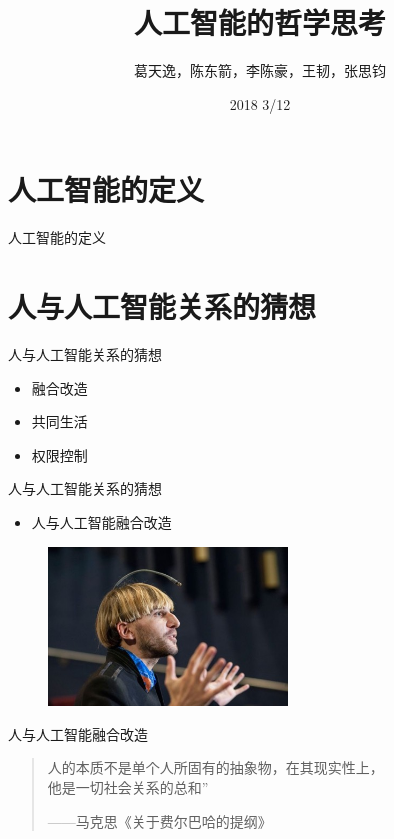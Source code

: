 \documentclass{beamer}
\title{人工智能的哲学思考}
\date{2018 3/12}
\author{葛天逸，陈东箭，李陈豪，王韧，张思钧}
\institute{马克思主义基本原理概论课堂讨论}
\begin{document}
  \maketitle
  \tableofcontents

  \section{人工智能的定义}
  \begin{frame}{人工智能的定义}
  \end{frame}

  \section{人与人工智能关系的猜想}
  \begin{frame}{人与人工智能关系的猜想}
    \begin{itemize}
     \item 融合改造
     \item 共同生活
     \item 权限控制
    \end{itemize}
  \end{frame}

  \begin{frame}{人与人工智能关系的猜想}
    \begin{itemize}
     \item  人与人工智能融合改造
    \end{itemize}
   \begin{figure}[H]
   \centering
   \includegraphics[width=2.5in]{gtyPic1.jpg}
   \end{figure}
  \end{frame}

  \begin{frame}{人与人工智能融合改造}
  \begin{quote}
    \hspace*{0.21in} 人的本质不是单个人所固有的抽象物，在其现实性上，\\
    他是一切社会关系的总和”
    \begin{flushright}
    ——马克思《关于费尔巴哈的提纲》
    \end{flushright}
  \end{quote}
  \end{frame}
\end{document}
